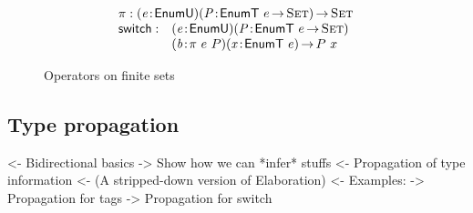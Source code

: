 \documentclass[preprint, authoryear, onecolumn]{sigplanconf}
\newenvironment{structure}{\footnotesize\verbatim}{\endverbatim}
\begin{document}
\begin{figure}

\[\stkl{
\F{$\pi$} : \PITEL{\V{e}}{\EnumU}
            \PITEL{\V{P}}{\EnumT{e} \To \Set} \To \Set 
\\
\begin{array}{@{}ll}
\F{switch} : & \PITEL{\V{e}}{\EnumU}
               \PITEL{\V{P}}{\EnumT{e} \To \Set} \\
             & \PITEL{\V{b}}{\spi{e}{P}}
               \PITEL{\V{x}}{\EnumT{e}} \To P~x
\end{array}
}\]

\caption{Operators on finite sets}
\label{fig:operator-finite-set}

\end{figure}

\subsection{Type propagation}

\begin{structure}
<- Bidirectional basics
    -> Show how we can *infer* stuffs 
        <- Propagation of type information
    <- (A stripped-down version of Elaboration)
<- Examples:
    -> Propagation for tags
    -> Propagation for switch
\end{structure}
\end{document}
